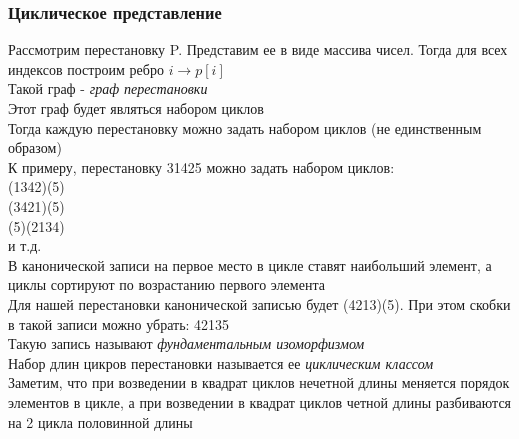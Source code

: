 \documentclass[12pt]{article}
\begin{document}
\subsubsection{Циклическое представление}
Рассмотрим перестановку P. Представим ее в виде массива чисел. Тогда для всех индексов построим ребро $i \rightarrow p[i]$\\
Такой граф - \textit{граф перестановки}\\
Этот граф будет являться набором циклов\\
Тогда каждую перестановку можно задать набором циклов (не единственным образом)\\
К примеру, перестановку 31425 можно задать набором циклов:\\
(1342)(5)\\
(3421)(5)\\
(5)(2134)\\
и т.д.\\
В канонической записи на первое место в цикле ставят наибольший элемент, а циклы сортируют по возрастанию первого элемента\\
Для нашей перестановки канонической записью будет (4213)(5). При этом скобки в такой записи можно убрать: 42135\\
Такую запись называют \textit{фундаментальным изоморфизмом}\\
Набор длин цикров перестановки называется ее \textit{циклическим классом}\\
Заметим, что при возведении в квадрат циклов нечетной длины меняется порядок элементов в цикле, а при возведении в квадрат циклов четной длины разбиваются на 2 цикла половинной длины\\
\end{document}
